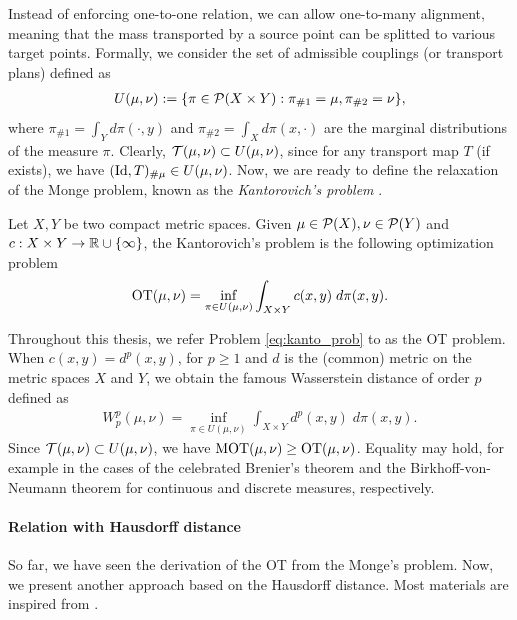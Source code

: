 Instead of enforcing one-to-one relation, we can allow one-to-many alignment,
meaning that the mass transported by a source point can be splitted to various target points.
Formally, we consider the set of admissible couplings (or transport plans) defined as
\begin{align}
  U(\mu, \nu) := \{ \pi \in \mathcal P(X \times Y): \pi_{\# 1} = \mu, \pi_{\# 2} = \nu \},
\end{align}
where $\pi_{\# 1} = \int_Y d \pi(\cdot, y)$ and $\pi_{\# 2} = \int_X d\pi(x, \cdot)$
are the marginal distributions of the measure $\pi$. Clearly, $\mathcal T(\mu, \nu) \subset U(\mu, \nu)$,
since for any transport map $T$ (if exists), we have $(\text{Id}, T)_{\# \mu} \in U(\mu, \nu)$. Now,
we are ready to define the relaxation of the Monge problem,
known as the \textit{Kantorovich's problem} \citep{Kanto42}.
\begin{definition}
  Let $X, Y$ be two compact metric spaces. Given $\mu \in \mathcal P(X), \nu \in \mathcal P(Y)$
  and $c: X \times Y \to \mathbb R \cup \{\infty\}$, the Kantorovich's problem is
  the following optimization problem
  \begin{align}
    \label{eq:kanto_prob}
    \text{OT}(\mu, \nu) = \inf_{\pi \in U(\mu, \nu)} \int_{X \times Y} c(x, y) \; d\pi(x, y).
  \end{align}
\end{definition}
Throughout this thesis, we refer Problem \eqref{eq:kanto_prob} to as the OT problem.
When $c(x, y) = d^p(x, y)$, for $p \geq 1$ and $d$ is the (common) metric on the metric spaces
$X$ and $Y$, we obtain the famous Wasserstein distance of order $p$ \citep{Villani03} defined as
\begin{align}
  W^p_p(\mu, \nu) = \inf_{\pi \in U(\mu, \nu)} \int_{X \times Y} d^p(x, y) \; d\pi(x, y).
\end{align}
Since $\mathcal T(\mu, \nu) \subset U(\mu, \nu)$, we have $\text{MOT}(\mu, \nu) \geq \text{OT}(\mu, \nu)$.
Equality may hold, for example in the cases of the celebrated Brenier's theorem \citep{Brenier87}
and the Birkhoff-von-Neumann theorem \citep{Birkhoff46} for continuous and discrete measures,
respectively.

\paragraph{Relation with Hausdorff distance}
So far, we have seen the derivation of the OT from the Monge's problem.
Now, we present another approach based on the Hausdorff distance.
Most materials are inspired from \citep{Memoli11}.

